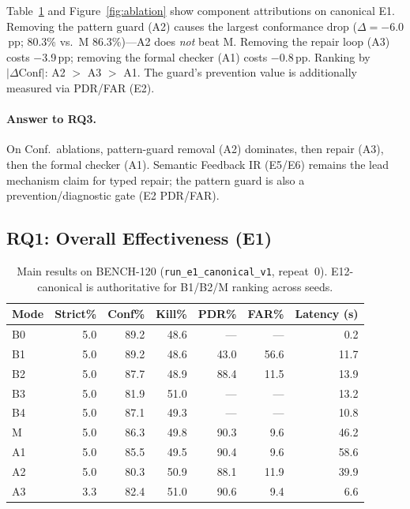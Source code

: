 Table~\ref{tab:main} and Figure~\ref{fig:ablation} show component attributions on
canonical E1.
Removing the pattern guard (A2) causes the largest conformance drop
($\Delta = -6.0$\,pp; 80.3\% vs.\ M 86.3\%)---A2 does \emph{not} beat M.
Removing the repair loop (A3) costs $-$3.9\,pp; removing the formal checker
(A1) costs $-$0.8\,pp.
Ranking by $|\Delta\mathrm{Conf}|$: A2 $>$ A3 $>$ A1.
The guard's prevention value is additionally measured via PDR/FAR (E2).

\paragraph{Answer to RQ3.}
On Conf.\ ablations, pattern-guard removal (A2) dominates, then repair (A3),
then the formal checker (A1).
Semantic Feedback IR (E5/E6) remains the lead mechanism claim for typed repair;
the pattern guard is also a prevention/diagnostic gate (E2 PDR/FAR).

\subsection{RQ1: Overall Effectiveness (E1)}

\begin{table}[t]
  \caption{Main results on BENCH-120 (\texttt{run\_e1\_canonical\_v1}, repeat~0).
    E12-canonical is authoritative for B1/B2/M ranking across seeds.}
  \label{tab:main}
  \centering
  \small
  \begin{tabular}{lrrrrrr}
    \toprule
    Mode & Strict\% & Conf\% & Kill\% & PDR\% & FAR\% & Latency (s) \\
    \midrule
    B0 & 5.0 & 89.2 & 48.6 & --- & --- & 0.2 \\
    B1 & 5.0 & 89.2 & 48.6 & 43.0 & 56.6 & 11.7 \\
    B2 & 5.0 & 87.7 & 48.9 & 88.4 & 11.5 & 13.9 \\
    B3 & 5.0 & 81.9 & 51.0 & --- & --- & 13.2 \\
    B4 & 5.0 & 87.1 & 49.3 & --- & --- & 10.8 \\
    M  & 5.0 & 86.3 & 49.8 & 90.3 & 9.6 & 46.2 \\
    A1 & 5.0 & 85.5 & 49.5 & 90.4 & 9.6 & 58.6 \\
    A2 & 5.0 & 80.3 & 50.9 & 88.1 & 11.9 & 39.9 \\
    A3 & 3.3 & 82.4 & 51.0 & 90.6 & 9.4 & 6.6 \\
    \bottomrule
  \end{tabular}
\end{table}

